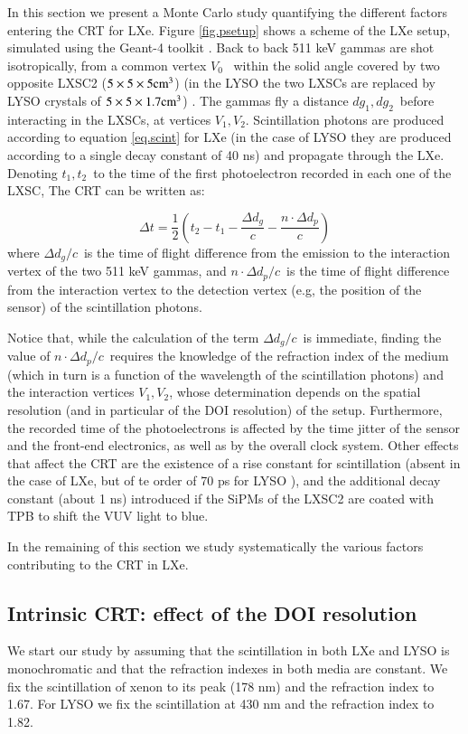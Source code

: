 \documentclass[review]{elsarticle}
\begin{document}
In this section we present a Monte Carlo study quantifying the different factors entering the CRT for LXe. Figure \ref{fig.psetup} shows a scheme of  the LXe setup, simulated using the Geant-4 toolkit \cite{Agostinelli:2002hh} . Back to back 511 keV gammas are shot isotropically, from a common vertex $V_0$~ within the solid angle covered by two opposite LXSC2 ($5 \times 5 \times 5 {\rm cm^3}$) (in the LYSO the two LXSCs are replaced by LYSO crystals of $5 \times 5 \times 1.7 {\rm cm^3}$) . The gammas fly a distance $dg_1, dg_2$~before interacting in the LXSCs, at vertices $V_1, V_2$. Scintillation photons are produced according to equation \ref{eq.scint} for LXe (in the case of LYSO they are produced according to a single decay constant of 40 ns) and propagate through the LXe. Denoting $t_1,t_2$~to the time of the first photoelectron recorded in each one of the LXSC, The CRT can be written as:

\begin{equation}
\Delta t = \frac{1}{2}(t_2 - t_1 - \frac{\Delta d_g}{c} - \frac{n \cdot \Delta d_p}{c}) 
\label{eq.CRT}
\end{equation}
%
where $\Delta d_g/c$~is the time of flight difference from the emission to the interaction vertex of the two 511 keV gammas, and $n \cdot \Delta d_p/c$~is the time of flight difference from the interaction vertex to the
detection vertex (e.g, the position of the sensor) of the scintillation photons. 

Notice that, while the calculation of the term $\Delta d_g/c$~is immediate, finding the value
of $n \cdot \Delta d_p/c$~requires the knowledge of the refraction index of the medium (which in turn is a function of the wavelength of the scintillation photons) and the interaction vertices $V_1,V_2$, whose determination depends on the spatial resolution (and in particular of the DOI resolution) of the setup. Furthermore, the recorded time of the photoelectrons is affected by the time jitter of the sensor and the front-end electronics, as well as by the overall clock system. Other effects that affect the CRT are the existence of a rise constant for scintillation (absent in the case of LXe, but of te order of 70 ps for LYSO \cite{Seifert}), and the additional decay constant (about 1 ns) introduced if the SiPMs of the LXSC2 are coated with TPB to shift the VUV light to blue. 

In the remaining of this section we study systematically the various factors contributing to the CRT in LXe. 

\subsection*{Intrinsic CRT: effect of the DOI resolution}
We start our study by assuming that the scintillation in both LXe and LYSO is monochromatic and that the refraction indexes in both media are constant. We fix the scintillation of xenon to its peak (178 nm) and
the refraction index to 1.67. For LYSO we fix the scintillation at 430 nm and the refraction index to 1.82. 
\end{document}
